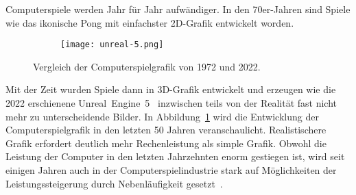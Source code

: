 
Computerspiele werden Jahr für Jahr aufwändiger. In den 70er-Jahren sind Spiele wie das ikonische Pong mit einfachster 2D-Grafik entwickelt worden. 
\begin{figure}
	\begin{subfigure}[b]{.49\textwidth}
		\centering
		\tikzset{external/export next=false}
	\end{subfigure}
	\begin{subfigure}[b]{.49\textwidth}
		\centering
		\texttt{[image: unreal-5.png]}
	\end{subfigure}
	\caption{Vergleich der Computerspielgrafik von 1972 und 2022.}\label{fig:grafikvergleich}
\end{figure}
Mit der Zeit wurden Spiele dann in 3D-Grafik entwickelt und erzeugen wie die 2022 erschienene Unreal~Engine~5~\cite{EpicGamesInc.} inzwischen teils von der Realität fast nicht mehr zu unterscheidende Bilder. In Abbildung~\ref{fig:grafikvergleich} wird die Entwicklung der Computerspielgrafik in den letzten 50 Jahren veranschaulicht. Realistischere Grafik erfordert deutlich mehr Rechenleistung als simple Grafik. Obwohl die Leistung der Computer in den letzten Jahrzehnten enorm gestiegen ist, wird seit einigen Jahren auch in der Computerspielindustrie stark auf Möglichkeiten der Leistungssteigerung durch Nebenläufigkeit gesetzt~\cite{Tatarchuk2014,Genova2015,Gyrling2015,Schott2016,Hodgman2016,White2018}.

